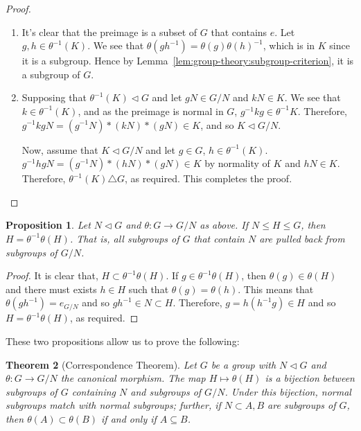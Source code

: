 \documentclass[12pt]{report}
\newtheorem{theorem}{Theorem}[section] %
\newtheorem{proposition}[theorem]{Proposition}
\theoremstyle{definition}
\begin{document}
\begin{proof}
  \begin{enumerate}
  \item
    It's clear that the preimage is a subset of \(G\) that contains \(e\).
    Let \(g, h \in \theta^{-1}(K)\).
    We see that \(\theta(gh^{-1}) = \theta(g)\theta(h)^{-1}\), which is in \(K\) since it is a subgroup.
    Hence by Lemma~\ref{lem:group-theory:subgroup-criterion}, it is a subgroup of \(G\).

    \item
      Supposing that \(\theta^{-1}(K) \triangleleft G\) and let \(gN \in G/N\) and \(kN \in K\).
      We see that \(k \in \theta^{-1}(K)\), and as the preimage is normal in \(G\), \(g^{-1}kg \in \theta^{-1}K\).
      Therefore, \(g^{-1}kgN = (g^{-1}N)*(kN)*(gN) \in K\), and so \(K \triangleleft G/N\).

      Now, assume that \(K \triangleleft G/N\) and let \(g \in G\), \(h \in \theta^{-1}(K)\).
      \(g^{-1}hgN = (g^{-1}N)*(hN)*(gN) \in K\) by normality of \(K\) and \(hN \in K\).
      Therefore, \(\theta^{-1}(K) \triangle G\), as required.
      This completes the proof.

  \end{enumerate}
\end{proof}

\begin{proposition}\label{prp:group-theory:normal-subgroups-pullback}
  Let \(N \triangleleft G\) and \(\theta : G \to G/N\) as above. If \(N \leq H \leq G\), then \(H = \theta^{-1}\theta(H)\).
  That is, all subgroups of \(G\) that contain \(N\) are pulled back from subgroups of \(G/N\).
\end{proposition}

\begin{proof}
  It is clear that, \(H \subset \theta^{-1}\theta (H)\).
  If \(g \in \theta^{-1}\theta(H)\), then \(\theta(g) \in \theta(H)\) and there must exists \(h \in H\) such that \(\theta(g) = \theta(h)\).
  This means that \(\theta(g h^{-1}) = e_{G/N}\) and so \(g h^{-1} \in N \subset H\).
  Therefore, \(g = h(h^{-1}g) \in H\) and so \(H = \theta^{-1}\theta(H)\), as required.
\end{proof}



These two propositions allow us to prove the following:

\begin{theorem}[Correspondence Theorem]
  \label{thm:group-theory:the-correspondence-theorem}
  Let \(G\) be a group with \(N \triangleleft G\) and \(\theta: G \to G/N\) the canonical morphism.
  The map \(H \mapsto \theta(H)\) is a bijection between subgroups of \(G\) containing \(N\) and subgroups of \(G/N\).
  Under this bijection, normal subgroups match with normal subgroups; further, if \(N \subset A,B\) are subgroups of \(G\), then \(\theta(A) \subset \theta(B)\) if and only if \(A \subseteq B\).
\end{theorem}
\end{document}
